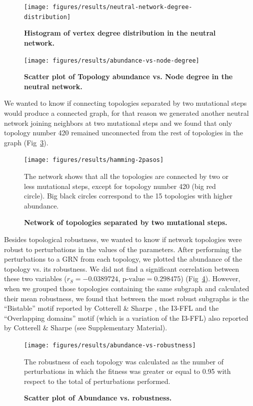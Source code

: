 \documentclass[10pt,letterpaper]{article}
\begin{document}
\begin{figure}[!h]
 \texttt{[image: figures/results/neutral-network-degree-distribution]}
 \caption{\bf Histogram of vertex degree distribution in the neutral network.}
 \label{fig:deg-dist}
\end{figure}

\begin{figure}[!h]
 \texttt{[image: figures/results/abundance-vs-node-degree]}
 \caption{\bf Scatter plot of Topology abundance vs. Node degree in the neutral
 network.}
 \label{fig:ab-deg}
\end{figure}

We wanted to know if connecting topologies separated by two mutational steps
would produce a connected graph, for that reason we generated another neutral
network joining neighbors at two mutational steps and we found that only 
topology number 420 remained unconnected from the rest of topologies in the 
graph (Fig~\ref{fig:2neut-net}).

\begin{figure}
 \texttt{[image: figures/results/hamming-2pasos]}
 \caption{\bf Network of topologies separated by two mutational steps.}
 The network shows that all the topologies are connected by two or less 
 mutational steps, except for topology number 420 (big red circle). Big black 
 circles correspond to the 15 topologies with higher abundance.
 \label{fig:2neut-net}
\end{figure}

Besides topological robustness, we wanted to know if network topologies were
robust to perturbations in the values of the parameters. After performing the
perturbations to a GRN from each topology, we plotted the abundance of the
topology vs. its robustness. We did not find a significant correlation between
these two variables ($r_S = −0.0389724$, $\text{p-value} = 0.298475$) 
(Fig~\ref{fig:ab-rob}). However, when we grouped those topologies containing 
the same subgraph and calculated their mean robustness, we found that between 
the most robust subgraphs is the ``Bistable'' motif reported by Cotterell \& 
Sharpe \cite{Cotterell2010}, the I3-FFL and the ``Overlapping domains'' motif 
(which is a variation of the I3-FFL) also reported by Cotterell \& Sharpe (see 
Supplementary Material).

\begin{figure}[!h]
 \texttt{[image: figures/results/abundance-vs-robustness]}
 \caption{\bf Scatter plot of Abundance vs. robustness.}
 The robustness of each topology was calculated as the number of perturbations
 in which the fitness was greater or equal to 0.95 with respect to the total of
 perturbations performed.
 \label{fig:ab-rob}
\end{figure}
\end{document}

